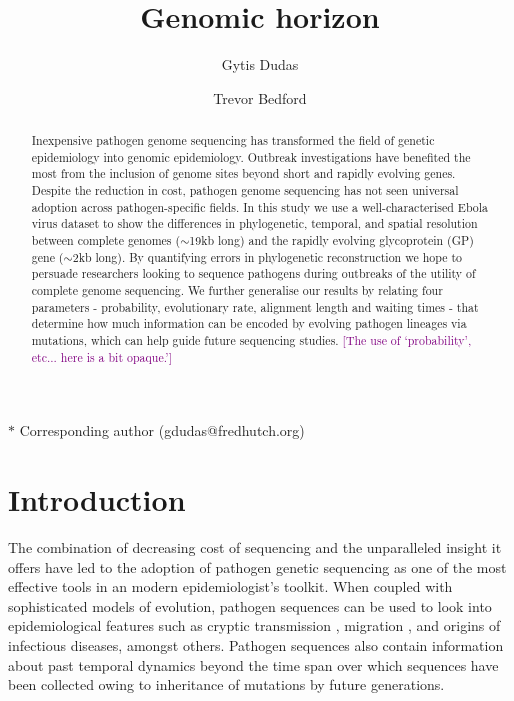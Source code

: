 \documentclass[11pt,oneside,letterpaper]{article}
\title{\vspace{1.0cm} \LARGE \bf Genomic horizon}
\author[1$\ast$]{Gytis Dudas}
\author[1]{Trevor Bedford}
\affil[1]{Vaccine and Infectious Disease Division, Fred Hutchinson Cancer Research Center, Seattle, WA, USA}
\def\tbc#1{\textcolor{purple}{[#1]}}
\begin{document}
\maketitle

\begin{abstract}
Inexpensive pathogen genome sequencing has transformed the field of genetic epidemiology into genomic epidemiology.
Outbreak investigations have benefited the most from the inclusion of genome sites beyond short and rapidly evolving genes.
Despite the reduction in cost, pathogen genome sequencing has not seen universal adoption across pathogen-specific fields.
In this study we use a well-characterised Ebola virus dataset to show the differences in phylogenetic, temporal, and spatial resolution between complete genomes ($\sim$19kb long) and the rapidly evolving glycoprotein (GP) gene ($\sim$2kb long).
By quantifying errors in phylogenetic reconstruction we hope to persuade researchers looking to sequence pathogens during outbreaks of the utility of complete genome sequencing.
We further generalise our results by relating four parameters - probability, evolutionary rate, alignment length and waiting times - that determine how much information can be encoded by evolving pathogen lineages via mutations, which can help guide future sequencing studies.
\tbc{The use of `probability', etc... here is a bit opaque.'}
\end{abstract}

$\ast$ \footnotesize{Corresponding author (gdudas@fredhutch.org)}

\pagebreak

\section*{Introduction}
The combination of decreasing cost of sequencing and the unparalleled insight it offers have led to the adoption of pathogen genetic sequencing as one of the most effective tools in an modern epidemiologist's toolkit.
When coupled with sophisticated models of evolution, pathogen sequences can be used to look into epidemiological features such as cryptic transmission \citep{faria_establishment_2017}, migration \citep{dudas_virus_2017}, and origins \citep{smith_origins_2009} of infectious diseases, amongst others.
Pathogen sequences also contain information about past temporal dynamics beyond the time span over which sequences have been collected \citep{raghwani_origin_2012} owing to inheritance of mutations by future generations.
\end{document}
